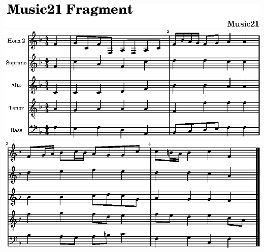 \includegraphics{../analysis/bwv1/2a/lily-0aa3d7a2-1}%
\ifx\betweenLilyPondSystem \undefined
  \linebreak
\else
  \expandafter{}%
\fi
\includegraphics{../analysis/bwv1/2a/lily-0aa3d7a2-2}%
\ifx\betweenLilyPondSystem \undefined
  \linebreak
\else
  \expandafter{}%
\fi
\includegraphics{../analysis/bwv1/2a/lily-0aa3d7a2-3}%
